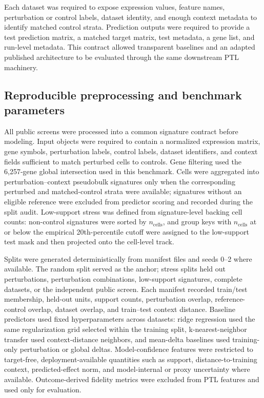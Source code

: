 Each dataset was required to expose expression values, feature names, perturbation or control labels, dataset identity, and enough context metadata to identify matched control strata. Prediction outputs were required to provide a test prediction matrix, a matched target matrix, test metadata, a gene list, and run-level metadata. This contract allowed transparent baselines and an adapted published architecture to be evaluated through the same downstream PTL machinery.

\subsection{Reproducible preprocessing and benchmark parameters}

All public screens were processed into a common signature contract before modeling. Input objects were required to contain a normalized expression matrix, gene symbols, perturbation labels, control labels, dataset identifiers, and context fields sufficient to match perturbed cells to controls. Gene filtering used the 6,257-gene global intersection used in this benchmark. Cells were aggregated into perturbation--context pseudobulk signatures only when the corresponding perturbed and matched-control strata were available; signatures without an eligible reference were excluded from predictor scoring and recorded during the split audit. Low-support stress was defined from signature-level backing cell counts: non-control signatures were sorted by \(n_{\mathrm{cells}}\), and group keys with \(n_{\mathrm{cells}}\) at or below the empirical 20th-percentile cutoff were assigned to the low-support test mask and then projected onto the cell-level track.

Splits were generated deterministically from manifest files and seeds 0--2 where available. The random split served as the anchor; stress splits held out perturbations, perturbation combinations, low-support signatures, complete datasets, or the independent public screen. Each manifest recorded train/test membership, held-out units, support counts, perturbation overlap, reference-control overlap, dataset overlap, and train--test context distance. Baseline predictors used fixed hyperparameters across datasets: ridge regression used the same regularization grid selected within the training split, k-nearest-neighbor transfer used context-distance neighbors, and mean-delta baselines used training-only perturbation or global deltas. Model-confidence features were restricted to target-free, deployment-available quantities such as support, distance-to-training context, predicted-effect norm, and model-internal or proxy uncertainty where available. Outcome-derived fidelity metrics were excluded from PTL features and used only for evaluation.

